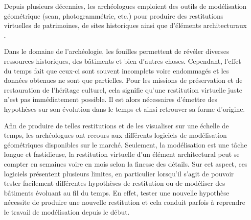 Depuis plusieurs décennies, les archéologues emploient des outils de
modélisation géométrique (scan, photogrammétrie, etc.) pour produire des
restitutions virtuelles de patrimoines, de sites historiques ainsi que
d'éléments architecturaux \cite{gomes20143d}. %

Dans le domaine de l'archéologie, les fouilles permettent de révéler diverses
ressources historiques, des bâtiments et bien d'autres choses. %
Cependant, l'effet du temps fait que ceux-ci sont souvent incomplets voire
endommagés et les données obtenues ne sont que partielles. %
Pour les missions de préservation et de restauration de l'héritage culturel,
cela signifie qu'une restitution virtuelle juste n'est pas immédiatement
possible. %
Il est alors nécessaires d'émettre des hypothèses sur son évolution dans le
temps et ainsi retrouver sa forme d'origine. %

Afin de produire de telles restitutions et de les visualiser sur une échelle de
temps, les archéologues ont recours aux différents logiciels de modélisation
géométriques disponibles sur le marché. %
Seulement, la modélisation est une tâche longue et fastidieuse, la restitution
virtuelle d'un élément architectural peut se compter en semaines voire en mois
selon la finesse des détails. %
Sur cet aspect, ces logiciels présentent plusieurs limites, en particulier
lorsqu'il s'agit de pouvoir tester facilement différentes hypothèses de
restitution ou de modéliser des bâtiments évoluant au fil du temps. %
En effet, tester une nouvelle hypothèse nécessite de produire une nouvelle
restitution et cela conduit parfois à reprendre le travail de modélisation
depuis le début. %



